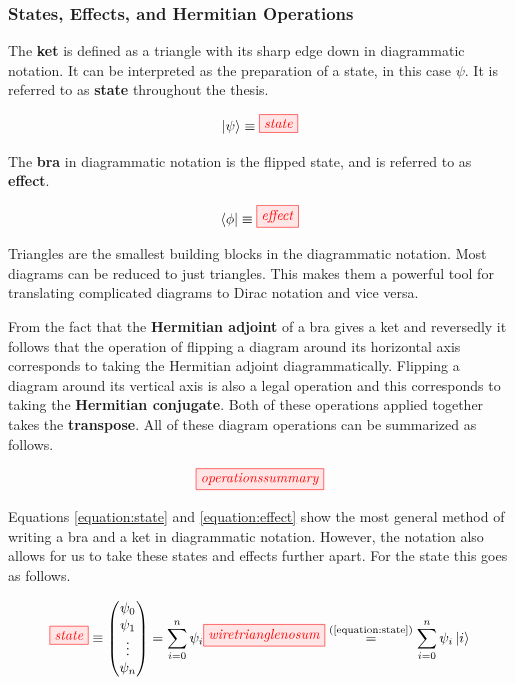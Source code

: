 \documentclass[]{article}
\newcommand{\equaltext}[1]{\ensuremath{\stackrel{\text{#1}}{=}}}
\begin{document}
\subsubsection{States, Effects, and Hermitian Operations}

\label{braandket}
The \textbf{ket} is defined as a triangle with its sharp edge down in diagrammatic notation. It can be interpreted as the preparation of a state, in this case $\psi$. It is referred to as \textbf{state} throughout the thesis.

\begin{equation}
\label{equation:state}
\ket{\psi} \equiv \tikzfig{state}
\end{equation}

The \textbf{bra} in diagrammatic notation is the flipped state, and is referred to as \textbf{effect}. 

\begin{equation}
\label{equation:effect}
\bra{\phi} \equiv \tikzfig{effect}
\end{equation}

Triangles are the smallest building blocks in the diagrammatic notation. Most diagrams can be reduced to just triangles. This makes them a powerful tool for translating complicated diagrams to Dirac notation and vice versa.

From the fact that the \textbf{Hermitian adjoint} of a bra gives a ket and reversedly it follows that the operation of flipping a diagram around its horizontal axis corresponds to taking the Hermitian adjoint diagrammatically. Flipping a diagram around its vertical axis is also a legal operation and this corresponds to taking the \textbf{Hermitian conjugate}. Both of these operations applied together takes the \textbf{transpose}. All of these diagram operations can be summarized as follows.

\begin{equation}
\tikzfig{operationssummary}
\end{equation}

Equations \ref{equation:state} and \ref{equation:effect} show the most general method of writing a bra and a ket in diagrammatic notation. However, the notation also allows for us to take these states and effects further apart. For the state this goes as follows. 

\begin{equation}
\label{effectapart}
\tikzfig{state} \equiv
\begin{pmatrix}
\psi_0 \\
\psi_1 \\
\vdots \\
\psi_n
\end{pmatrix} = \sum\limits_{i=0}^{n} \psi_i \tikzfig{wiretrianglenosum} \equaltext{(\ref{equation:state})} \sum\limits_{i=0}^{n} \psi_i \ket{i}
\end{equation}
\end{document}
